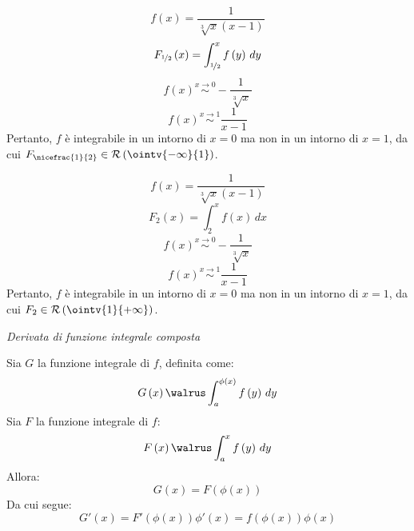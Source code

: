 \begin{example}
  $$f\left( x \right)=\frac{1}{\sqrt[3]{x}\left( x-1 \right)}$$
  $$F_{\nicefrac{1}{2}}\left( x \right)=\int_{\nicefrac{1}{2}}^xf\left( y \right)\,dy$$
  $$f\left( x \right)\stackrel{x\to0}{\sim}-\frac{1}{\sqrt[3]{x}}$$
  $$f\left( x \right)\stackrel{x\to1}{\sim}\frac{1}{x-1}$$
  Pertanto, $f$ è integrabile in un intorno di $x=0$ ma non in un intorno di $x=1$, da cui $F_{\nicefrac{1}{2}}\in\mathcal{R}\left( \ointv{-\infty}{1} \right)$.
\end{example}

\begin{example}
  $$f\left( x \right)=\frac{1}{\sqrt[3]{x}\left( x-1 \right)}$$
  $$F_2\left( x \right)=\int_2^xf\left( x \right)\,dx$$
  $$f\left( x \right)\stackrel{x\to0}{\sim}-\frac{1}{\sqrt[3]{x}}$$
  $$f\left( x \right)\stackrel{x\to1}{\sim}\frac{1}{x-1}$$
  Pertanto, $f$ è integrabile in un intorno di $x=0$ ma non in un intorno di $x=1$, da cui $F_2\in\mathcal{R}\left( \ointv{1}{+\infty} \right)$.
\end{example}

\begin{observation}
  \emph{Derivata di funzione integrale composta}
  
  Sia $G$ la funzione integrale di $f$, definita come:
  $$G\left( x \right)\walrus\int_a^{\phi\left( x \right)}f\left( y \right)\,dy$$
  Sia $F$ la funzione integrale di $f$:
  $$F\left( x \right)\walrus\int_a^xf\left( y \right)\,dy$$
  Allora:
  $$G\left( x \right)=F\left( \phi\left( x \right) \right)$$
  Da cui segue:
  $$G'\left( x \right)=F'\left( \phi\left( x \right) \right)\phi'\left( x \right)=f\left( \phi\left( x \right) \right)\phi\left( x \right)$$
\end{observation}
